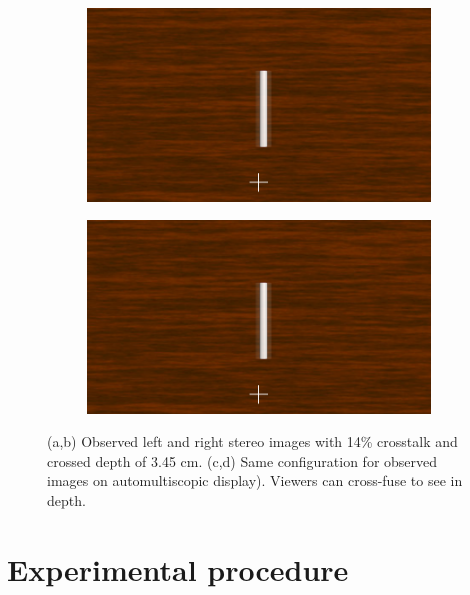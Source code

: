 \begin{figure}[htbp]
    \begin{subfigure}[b]{0.5\textwidth}
        \includegraphics[width=\textwidth]{./Template_Figures/auto_ghost_left}
        \caption{}\label{fig:obs_aut_left}
    \end{subfigure}
    \begin{subfigure}[b]{0.5\textwidth}
        \includegraphics[width=\textwidth]{./Template_Figures/auto_ghost_left}
        \caption{}\label{fig:obs_aut_right}
    \end{subfigure}
    \caption{(a,b) Observed left and right stereo images with 14\% crosstalk and crossed depth of 3.45 cm. (c,d) Same configuration for observed images on automultiscopic display). Viewers can cross-fuse to see in depth.\label{fig:observed_ct_images}}
\end{figure}

\section{Experimental procedure}
